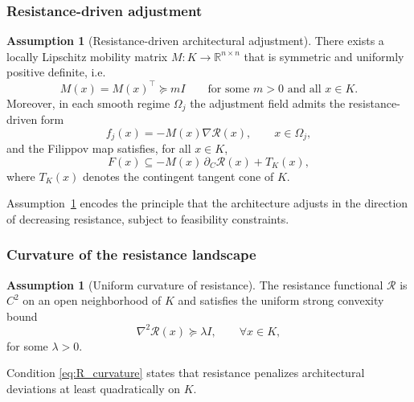\documentclass[12pt]{article}
\theoremstyle{plain}
\theoremstyle{definition}
\newtheorem{assumption}[theorem]{Assumption}
\theoremstyle{remark}
\begin{document}
\subsubsection*{Resistance-driven adjustment}

\begin{assumption}[Resistance-driven architectural adjustment]
\label{ass:resistance_driven}
There exists a locally Lipschitz mobility matrix
$M:K\to\mathbb R^{n\times n}$ that is symmetric and uniformly positive
definite, i.e.
\begin{equation}
M(x)=M(x)^\top \succeq mI
\qquad \text{for some } m>0 \text{ and all } x\in K .
\label{eq:mobility_lower_bound}
\end{equation}
Moreover, in each smooth regime $\Omega_j$ the adjustment field admits
the resistance-driven form
\begin{equation}
f_j(x) = -M(x)\nabla \mathcal R(x),
\qquad x\in \Omega_j,
\label{eq:regime_gradient_form}
\end{equation}
and the Filippov map satisfies, for all $x\in K$,
\begin{equation}
F(x)\subseteq -M(x)\,\partial_C \mathcal R(x) + T_K(x),
\label{eq:resistance_driven}
\end{equation}
where $T_K(x)$ denotes the contingent tangent cone of $K$.
\end{assumption}

Assumption~\ref{ass:resistance_driven} encodes the principle that the
architecture adjusts in the direction of decreasing resistance, subject
to feasibility constraints.

\subsubsection*{Curvature of the resistance landscape}

\begin{assumption}[Uniform curvature of resistance]
\label{ass:R_curvature}
The resistance functional $\mathcal R$ is $C^2$ on an open neighborhood
of $K$ and satisfies the uniform strong convexity bound
\begin{equation}
\nabla^2 \mathcal R(x) \succeq \lambda I,
\qquad \forall x\in K,
\label{eq:R_curvature}
\end{equation}
for some $\lambda>0$.
\end{assumption}

Condition \eqref{eq:R_curvature} states that resistance penalizes
architectural deviations at least quadratically on $K$.
\end{document}
